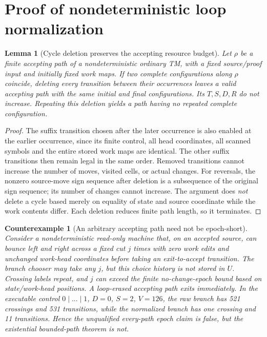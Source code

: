 \documentclass[11pt]{article}
\newtheorem{lemma}[theorem]{Lemma}
\newtheorem{counterexample}[theorem]{Counterexample}
\begin{document}
\section{Proof of nondeterministic loop normalization}
\begin{lemma}[Cycle deletion preserves the accepting resource budget]
Let $\rho$ be a finite accepting path of a nondeterministic ordinary TM, with a fixed source/proof input and initially fixed work maps. If two complete configurations along $\rho$ coincide, deleting every transition between their occurrences leaves a valid accepting path with the same initial and final configurations. Its $T,S,D,R$ do not increase. Repeating this deletion yields a path having no repeated complete configuration.
\end{lemma}
\begin{proof}
The suffix transition chosen after the later occurrence is also enabled at the earlier occurrence, since its finite control, all head coordinates, all scanned symbols and the entire stored work maps are identical. The other suffix transitions then remain legal in the same order. Removed transitions cannot increase the number of moves, visited cells, or actual changes. For reversals, the nonzero source-move sign sequence after deletion is a subsequence of the original sign sequence; its number of changes cannot increase. The argument does \emph{not} delete a cycle based merely on equality of state and source coordinate while the work contents differ. Each deletion reduces finite path length, so it terminates.
\end{proof}
\begin{counterexample}[An arbitrary accepting path need not be epoch-short]
Consider a nondeterministic read-only machine that, on an accepted source, can bounce left and right across a fixed cut $j$ times with \emph{zero} work edits and unchanged work-head coordinates before taking an exit-to-accept transition. The branch chooser may take any $j$, but this choice history is not stored in $U$. Crossing labels repeat, and $j$ can exceed the finite no-change-epoch bound based on state/work-head positions. A loop-erased accepting path exits immediately. In the executable control $0\mid...\mid1$, $D=0$, $S=2$, $V=126$, the raw branch has 521 crossings and 531 transitions, while the normalized branch has one crossing and 11 transitions. Hence the unqualified \emph{every-path} epoch claim is false, but the \emph{existential bounded-path} theorem is not.
\end{counterexample}
\end{document}
